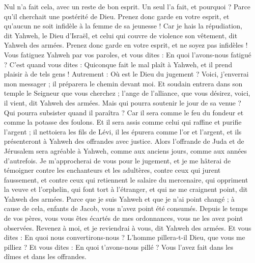 \begin{multicols}{2}
Nul n’a fait cela, avec un reste de bon esprit. Un seul l’a fait, et pourquoi ? Parce qu'il cherchait une postérité de Dieu. Prenez donc garde en votre esprit, et qu’aucun ne soit infidèle à la femme de sa jeunesse !
Car je hais la répudiation, dit Yahweh, le Dieu d'Israël, et celui qui couvre de violence son vêtement, dit Yahweh des armées. Prenez donc garde en votre esprit, et ne soyez pas infidèles !
Vous fatiguez Yahweh par vos paroles, et vous dites : En quoi l'avons-nous fatigué ? C'est quand vous dites : Quiconque fait le mal plaît à Yahweh, et il prend plaisir à de tels gens ! Autrement : Où est le Dieu du jugement ?
\VerseOne{}Voici, j'enverrai mon messager ; il préparera le chemin devant moi. Et soudain entrera dans son temple le Seigneur que vous cherchez ; l’ange de l'alliance, que vous désirez, voici, il vient, dit Yahweh des armées.
Mais qui pourra soutenir le jour de sa venue ? Qui pourra subsister quand il paraîtra ? Car il sera comme le feu du fondeur et comme la potasse des foulons.
Et il sera assis comme celui qui raffine et purifie l'argent ; il nettoiera les fils de Lévi, il les épurera comme l’or et l'argent, et ils présenteront à Yahweh des offrandes avec justice.
Alors l’offrande de Juda et de Jérusalem sera agréable à Yahweh, comme aux anciens jours, comme aux années d'autrefois.
Je m'approcherai de vous pour le jugement, et je me hâterai de témoigner contre les enchanteurs et les adultères, contre ceux qui jurent faussement, et contre ceux qui retiennent le salaire du mercenaire, qui oppriment la veuve et l'orphelin, qui font tort à l'étranger, et qui ne me craignent point, dit Yahweh des armées.
Parce que je suis Yahweh et que je n'ai point changé ; à cause de cela, enfants de Jacob, vous n'avez point été consumés.
Depuis le temps de vos pères, vous vous êtes écartés de mes ordonnances, vous ne les avez point observées. Revenez à moi, et je reviendrai à vous, dit Yahweh des armées. Et vous dites : En quoi nous convertirons-nous ?
L'homme pillera-t-il Dieu, que vous me pilliez ? Et vous dites : En quoi t'avons-nous pillé ? Vous l'avez fait dans les dîmes et dans les offrandes.

\end{multicols}
